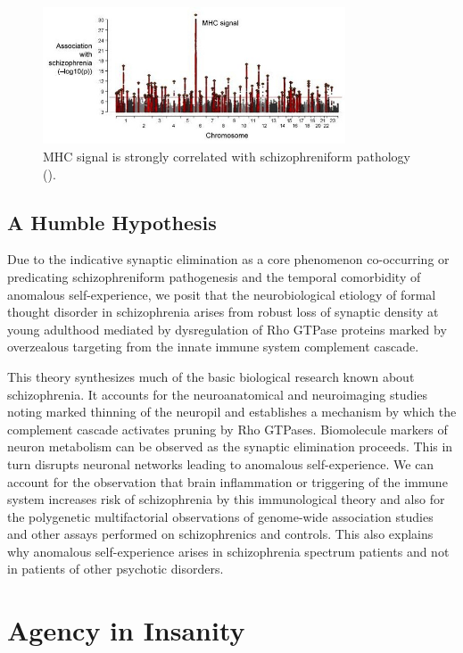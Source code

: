 \documentclass[]{article}
\begin{document}
		\begin{figure}
			\centering
			\includegraphics*[width=0.8\textwidth]{graphics/MajorHistocompatibilityComplex}
			\caption{MHC signal is strongly correlated with schizophreniform pathology (\cite{SekarSchizophreniariskcomplex2016}).}
		\end{figure}
		
	\subsection{A Humble Hypothesis}
		
		Due to the indicative synaptic elimination as a core phenomenon co-occurring or predicating schizophreniform pathogenesis and the temporal comorbidity of anomalous self-experience, we posit that the neurobiological etiology of formal thought disorder in schizophrenia arises from robust loss of synaptic density at young adulthood mediated by dysregulation of Rho GTPase proteins marked by overzealous targeting from the innate immune system complement cascade.
		
		This theory synthesizes much of the basic biological research known about schizophrenia. It accounts for the neuroanatomical and neuroimaging studies noting marked thinning of the neuropil and establishes a mechanism by which the complement cascade activates pruning by Rho GTPases. Biomolecule markers of neuron metabolism can be observed as the synaptic elimination proceeds. This in turn disrupts neuronal networks leading to anomalous self-experience. We can account for the observation that brain inflammation or triggering of the immune system increases risk of schizophrenia by this immunological theory and also for the polygenetic multifactorial observations of genome-wide association studies and other assays performed on schizophrenics and controls. This also explains why anomalous self-experience arises in schizophrenia spectrum patients and not in patients of other psychotic disorders.
	
\section{Agency in Insanity}
\end{document}
